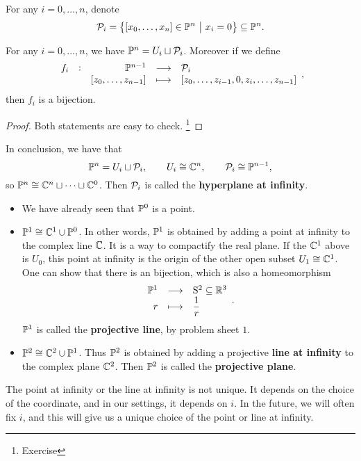 \begin{notation}
For any $ i = 0, \dots, n $, denote
$$ \PPP_i = \cbr{\sbr{x_0, \dots, x_n} \in \PP^n \st x_i = 0} \subseteq \PP^n. $$
\end{notation}

\begin{lemma}
\label{lem:3.13}
For any $ i = 0, \dots, n $, we have $ \mathbb{P}^n = U_i \sqcup \mathcal{P}_i $. Moreover if we define
$$ \function[f_i]{\PP^{n - 1}}{\PPP_i}{\sbr{z_0, \dots, z_{n - 1}}}{\sbr{z_0, \dots, z_{i - 1}, 0, z_i, \dots, z_{n - 1}}}, $$
then $ f_i $ is a bijection.
\end{lemma}

\begin{proof}
Both statements are easy to check. \footnote{Exercise}
\end{proof}

In conclusion, we have that
$$ \mathbb{P}^n = U_i \sqcup \mathcal{P}_i, \qquad U_i \cong \mathbb{C}^n, \qquad \mathcal{P}_i \cong \mathbb{P}^{n - 1}, $$
so $ \mathbb{P}^n \cong \mathbb{C}^n \sqcup \dots \sqcup \mathbb{C}^0 $. Then $ \mathcal{P}_i $ is called the \textbf{hyperplane at infinity}.

\begin{example}
\hfill
\begin{itemize}
\item We have already seen that $ \mathbb{P}^0 $ is a point.
\item $ \mathbb{P}^1 \cong \mathbb{C}^1 \cup \mathbb{P}^0 $. In other words, $ \mathbb{P}^1 $ is obtained by adding a point at infinity to the complex line $ \mathbb{C} $. It is a way to compactify the real plane. If the $ \mathbb{C}^1 $ above is $ U_0 $, this point at infinity is the origin of the other open subset $ U_1 \cong \mathbb{C}^1 $. One can show that there is an bijection, which is also a homeomorphism
$$ \function{\PP^1}{\S^2 \subseteq \RR^3}{r}{\dfrac{1}{r}}. $$
$ \mathbb{P}^1 $ is called the \textbf{projective line}, by problem sheet $ 1 $.
\item $ \mathbb{P}^2 \cong \mathbb{C}^2 \cup \mathbb{P}^1 $. Thus $ \mathbb{P}^2 $ is obtained by adding a projective \textbf{line at infinity} to the complex plane $ \mathbb{C}^2 $. Then $ \mathbb{P}^2 $ is called the \textbf{projective plane}.
\end{itemize}
\end{example}

\begin{note*}
The point at infinity or the line at infinity is not unique. It depends on the choice of the coordinate, and in our settings, it depends on $ i $. In the future, we will often fix $ i $, and this will give us a unique choice of the point or line at infinity.
\end{note*}


